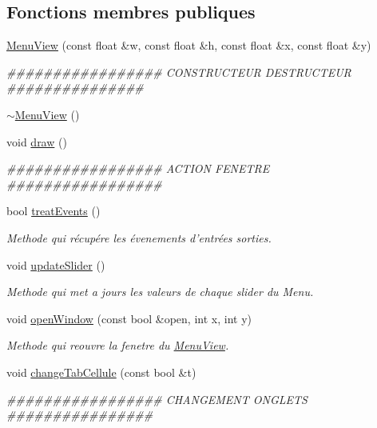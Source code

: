\subsection*{Fonctions membres publiques}
\begin{DoxyCompactItemize}
\item 
\hyperlink{classMenuView_ae710ce83508b0f6ed1bdfc82808a1649}{MenuView} (const float \&w, const float \&h, const float \&x, const float \&y)
\begin{DoxyCompactList}\small\item\em \#\#\#\#\#\#\#\#\#\#\#\#\#\#\#\#\# CONSTRUCTEUR DESTRUCTEUR \#\#\#\#\#\#\#\#\#\#\#\#\#\#\# \end{DoxyCompactList}\item 
\hyperlink{classMenuView_a4a88288f9b34c9651e3cc26cc7de977a}{$\sim$MenuView} ()
\item 
void \hyperlink{classMenuView_adb5b3eb08b57b3b2203bd391f12f2508}{draw} ()
\begin{DoxyCompactList}\small\item\em \#\#\#\#\#\#\#\#\#\#\#\#\#\#\#\#\# ACTION FENETRE \#\#\#\#\#\#\#\#\#\#\#\#\#\#\#\#\# \end{DoxyCompactList}\item 
bool \hyperlink{classMenuView_a1834e64b341049e7f6a28a265de80a0f}{treatEvents} ()
\begin{DoxyCompactList}\small\item\em Methode qui récupére les évenements d'entrées sorties. \end{DoxyCompactList}\item 
void \hyperlink{classMenuView_adf9242e71526c12177bd582631ea6067}{updateSlider} ()
\begin{DoxyCompactList}\small\item\em Methode qui met a jours les valeurs de chaque slider du Menu. \end{DoxyCompactList}\item 
void \hyperlink{classMenuView_af41eff2e272224e69b1328e448224b2c}{openWindow} (const bool \&open, int x, int y)
\begin{DoxyCompactList}\small\item\em Methode qui reouvre la fenetre du \hyperlink{classMenuView}{MenuView}. \end{DoxyCompactList}\item 
void \hyperlink{classMenuView_a4cd88f13fab8f23c8341ebfdfcc38763}{changeTabCellule} (const bool \&t)
\begin{DoxyCompactList}\small\item\em \#\#\#\#\#\#\#\#\#\#\#\#\#\#\#\#\# CHANGEMENT ONGLETS \#\#\#\#\#\#\#\#\#\#\#\#\#\#\#\# \end{DoxyCompactList}\item 

\end{DoxyCompactItemize}
